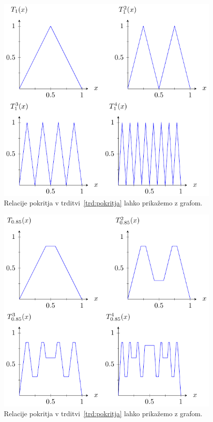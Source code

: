 \documentclass[mat2]{fmfdelo}
\begin{document}
\begin{figure}[h]
  \centering
  \includegraphics{images/funkcija_T1.pdf}
  \caption[Primer vektorske slike.]{Relacije pokritja v trditvi~\ref{trd:pokritja} lahko prikažemo z grafom.}
  \label{fig:T1}
\end{figure}

\begin{figure}[h]
  \centering
  \includegraphics{images/odrezana_funkcija.pdf}
  \caption[Primer vektorske slike.]{Relacije pokritja v trditvi~\ref{trd:pokritja} lahko prikažemo z grafom.}
  \label{fig:nkotnik}
\end{figure}
\end{document}

